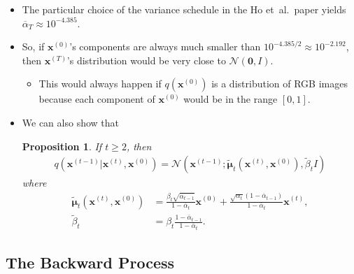 \documentclass[10pt]{article}
\newtheorem{proposition}[lemma]{Proposition}
\newcommand{\ve}[1]{\mathbf{#1}}
\newcommand{\ves}[1]{\boldsymbol{#1}}
\newcommand{\etal}{{et~al.}}
\newcommand{\mcal}[1]{\mathcal{#1}}
\begin{document}
\begin{itemize}
  \item The particular choice of the variance schedule in the Ho \etal\ paper yields $\overline{\alpha}_T \approx 10^{-4.385}$. 
  
  \item So, if $\ve{x}^{(0)}$'s components are always much smaller than $10^{-4.385 / 2} \approx 10^{-2.192}$, then $\ve{x}^{(T)}$'s distribution would be very close to $\mcal{N}(\ve{0}, I)$.
  \begin{itemize}
    \item This would always happen if $q(\ve{x}^{(0)})$ is a distribution of RGB images because each component of $\ve{x}^{(0)}$ would be in the range $[0,1]$.
  \end{itemize}

  \item We can also show that
  \begin{proposition} \label{ddpm-t-minus-one-from-t-and-zero}
    If $t \geq 2$, then
    \begin{align*}
      q(\ve{x}^{(t-1)}| \ve{x}^{(t)}, \ve{x}^{(0)})
      = \mathcal{N}(\ve{x}^{(t-1)}; \tilde{\ves{\mu}}_t(\ve{x}^{(t)},\ve{x}^{(0)}), \tilde{\beta}_t I)
    \end{align*}
    where
    \begin{align*}
      \tilde{\ves{\mu}}_t(\ve{x}^{(t)},\ve{x}^{(0)}) 
      &= \frac{\beta_{t}  \sqrt{\overline{\alpha}_{t-1}} }{1 - \overline{\alpha}_{t}} \ve{x}^{(0)} 
      +  \frac{\sqrt{\alpha_{t}} (1-\overline{\alpha}_{t-1})}{1 - \overline{\alpha}_{t}} \ve{x}^{(t)}, \\
      \tilde{\beta}_t &= \beta_{t} \frac{1-\overline{\alpha}_{t-1}}{1 - \overline{\alpha}_{t}}.
    \end{align*}
  \end{proposition}
\end{itemize}

\subsection{The Backward Process}
\end{document}
